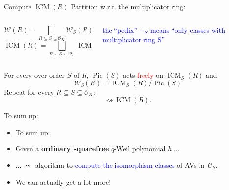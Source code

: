 \documentclass[usenames,dvipsnames,handout]{beamer}
\DeclareMathOperator{\ICM}{ICM}
\DeclareMathOperator{\Pic}{Pic}
\newcommand{\cC}{{\mathcal C}}
\newcommand{\cO}{{\mathcal O}}
\newcommand{\cW}{{\mathcal W}}
\newcommand{\red}[1]{\textcolor{red}{#1}}
\newcommand{\blue}[1]{\textcolor{blue}{#1}}
\begin{document}
\begin{frame}{ Compute $\ICM(R)$ }
\pause 
    Partition w.r.t. the multiplicator ring:
    \begin{columns}
    \begin{column}{0.5\textwidth}
      \[ \cW(R) = \bigsqcup_{R\subseteq S \subseteq \cO_K} \cW_S(R)\]
      \[ \ICM(R) = \bigsqcup_{R\subseteq S \subseteq \cO_K} \ICM_S(R)\]
    \end{column}
\pause
    \begin{column}{0.5\textwidth}  %
    \begin{center}
    \textcolor{blue}{\parbox{10em}{the ``pedix'' $-_S$ means ``only classes with multiplicator ring S''}} 
    \end{center}
    \end{column}
    \end{columns}
\pause
    \begin{theorem}[M.]
    For every over-order $S$ of $R$, $\Pic(S)$ acts \red{freely} on $\ICM_S(R)$ and
    \[ \cW_S(R) = \ICM_S(R) / \Pic(S) \]
\pause
    Repeat for every $R\subseteq S \subseteq \cO_K$:
    \[ \rightsquigarrow \ICM(R).\]
    \end{theorem}
\end{frame}

\begin{frame}{ To sum up: }
    \begin{itemize}
    \item To sum up:
\pause
    \item Given a {\bf ordinary squarefree} $q$-Weil polynomial $h$ ...
\pause
    \item ... $\leadsto$ algorithm to \blue{compute the isomorphism classes} of AVs in~$\cC_h$.
\pause    
    \item We can actually get a lot more!
    \end{itemize}
\end{frame}
\end{document}
